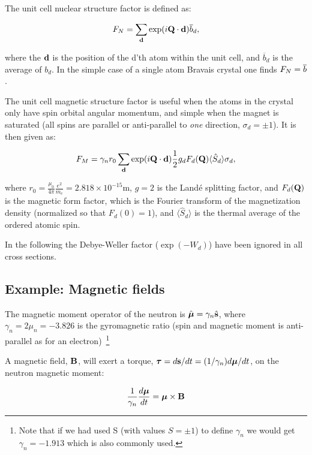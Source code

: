 The unit cell nuclear structure factor is defined as:

\begin{equation}
  F_N = \sum_{\mathbf{d}}
  \exp(i\mathbf{Q} \cdot \mathbf{d})\overline{b}_d,
\end{equation}

where the $\mathbf{d}$ is the position of the d'th atom within the unit cell,
and $\overline{b}_d$ is the average of $b_d$. In the simple case of a
single atom Bravais crystal one finds $F_N = \overline{b}$.

The unit cell magnetic structure factor is useful when the atoms in
the crystal only have spin orbital angular momentum, and simple when
the magnet is saturated (all spins are parallel or anti-parallel to
\emph{one} direction, $\sigma_d=\pm1$). It is then given as:

\begin{equation}
  F_M =
  \gamma_n r_0 \sum_{\mathbf{d}} \exp(i\mathbf{Q} \cdot \mathbf{d})\frac{1}{2}g_d F_d(\mathbf{Q})\langle
  \hat{S}_d\rangle \sigma_d,
\end{equation}

where $r_0=\frac{\mu_0}{4\pi}\frac{e^2}{m_e} = 2.818 \times 10^{-15}$m, $g=2$ is the
Land{\'e} splitting factor, and $F_d(\mathbf{Q})$ is the magnetic form factor, which
is the Fourier transform of the magnetization density (normalized so that
$F_d(0) = 1$), and $\langle \hat{S}_d\rangle$ is the thermal average of the
ordered atomic spin.

In the following the Debye-Weller factor ($\exp(-W_d)$) have been ignored in
all cross sections.

\subsection{Example: Magnetic fields}

The magnetic moment operator of the neutron is $\hat{\boldsymbol{\mu}} = \gamma_n \hat{\mathbf{s}}$, where
$\gamma_n = 2 \mu_n = -3.826$ is the gyromagnetic ratio (spin and magnetic
moment is anti-parallel as for an electron)~\footnote{Note that if we had used
S (with values $S=\pm 1$) to define $\gamma_n$ we would get $\gamma_n =
-1.913$ which is also commonly used.}

A magnetic field, $\mathbf{B}$, will exert a torque, $\boldsymbol{\tau} = d\mathbf{s}/dt = (1/\gamma_n)d\boldsymbol{\mu}/dt$, on the neutron magnetic moment:

\begin{equation}
  \label{eq:torque}
  \frac{1}{\gamma_n} \frac{d\boldsymbol{\mu}}{dt} = \boldsymbol{\mu} \times \mathbf{B}
\end{equation}

